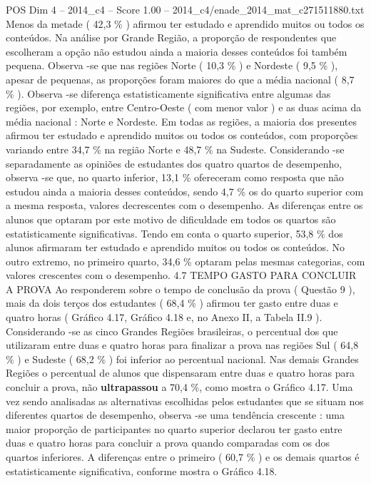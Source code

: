 \begin{textsample}{POS Dim 4 – 2014\_c4 – Score 1.00 – 2014\_c4/enade\_2014\_mat\_c271511880.txt}
Menos da metade ( 42,3 \% ) afirmou ter estudado e aprendido muitos ou todos os conteúdos.
Na análise por Grande Região, a proporção de respondentes que escolheram a opção não estudou ainda a maioria desses conteúdos foi também pequena.
Observa -se que nas regiões Norte ( 10,3 \% ) e Nordeste ( 9,5 \% ), apesar de pequenas, as proporções foram maiores do que a média nacional ( 8,7 \% ).
Observa -se diferença estatisticamente significativa entre algumas das regiões, por exemplo, entre Centro-Oeste ( com menor valor ) e as duas acima da média nacional : Norte e Nordeste.
Em todas as regiões, a maioria dos presentes afirmou ter estudado e aprendido muitos ou todos os conteúdos, com proporções variando entre 34,7 \% na região Norte e 48,7 \% na Sudeste.
Considerando -se separadamente as opiniões de estudantes dos quatro quartos de desempenho, observa -se que, no quarto inferior, 13,1 \% ofereceram como resposta que não estudou ainda a maioria desses conteúdos, sendo 4,7 \% os do quarto superior com a mesma resposta, valores decrescentes com o desempenho.
As diferenças entre os alunos que optaram por este motivo de dificuldade em todos os quartos são estatisticamente significativas.
Tendo em conta o quarto superior, 53,8 \% dos alunos afirmaram ter estudado e aprendido muitos ou todos os conteúdos.
No outro extremo, no primeiro quarto, 34,6 \% optaram pelas mesmas categorias, com valores crescentes com o desempenho. 4.7 TEMPO GASTO PARA CONCLUIR A PROVA Ao responderem sobre o tempo de conclusão da prova ( Questão 9 ), mais da dois terços dos estudantes ( 68,4 \% ) afirmou ter gasto entre duas e quatro horas ( Gráfico 4.17, Gráfico 4.18 e, no Anexo II, a Tabela II.9 ).
Considerando -se as cinco Grandes Regiões brasileiras, o percentual dos que utilizaram entre duas e quatro horas para finalizar a prova nas regiões Sul ( 64,8 \% ) e Sudeste ( 68,2 \% ) foi inferior ao percentual nacional.
Nas demais Grandes Regiões o percentual de alunos que dispensaram entre duas e quatro horas para concluir a prova, não \textbf{ultrapassou} a 70,4 \%, como mostra o Gráfico 4.17.
Uma vez sendo analisadas as alternativas escolhidas pelos estudantes que se situam nos diferentes quartos de desempenho, observa -se uma tendência crescente : uma maior proporção de participantes no quarto superior declarou ter gasto entre duas e quatro horas para concluir a prova quando comparadas com os dos quartos inferiores.
A diferenças entre o primeiro ( 60,7 \% ) e os demais quartos é estatisticamente significativa, conforme mostra o Gráfico 4.18.

\end{textsample}
